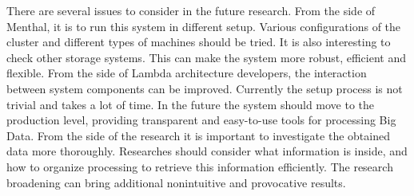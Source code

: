 There are several issues to consider in the future research.
From the side of Menthal, it is to run this system in different setup.
Various configurations of the cluster and different types of machines should be tried.
It is also interesting to check other storage systems.
This can make the system more robust, efficient and flexible.
From the side of Lambda architecture developers, the interaction between system components can be improved.
Currently the setup process is not trivial and takes a lot of time.
In the future the system should move to the production level, providing transparent and easy-to-use tools for processing Big Data.
From the side of the research it is important to investigate the obtained data more thoroughly.
Researches should consider what information is inside, and how to organize processing to retrieve this information efficiently.
The research broadening can bring additional nonintuitive and provocative results.


